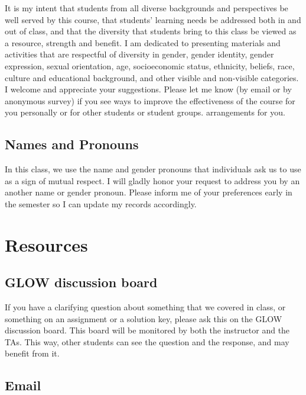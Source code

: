 \documentclass[11pt]{article}
\begin{document}
It is my intent that students from all diverse backgrounds and perspectives be well served by this
course, that students' learning needs be addressed both in and out of class, and that the diversity
that students bring to this class be viewed as a resource, strength and benefit. I am dedicated
to presenting materials and activities that are respectful of diversity in gender, gender identity,
gender expression, sexual orientation, age, socioeconomic status, ethnicity, beliefs, race, culture
and educational background, and other visible and non-visible categories. I welcome and appreciate your suggestions. Please let me know (by email or by anonymous survey) if you see ways to improve the effectiveness of the course for you personally or for other students or student groups. %
arrangements for you.

\subsection{Names and Pronouns}

In this class, we use the name and gender pronouns that individuals ask us to use as a sign of mutual respect. I will gladly honor your request to address you by an another name or gender pronoun. Please inform me of your preferences early in the semester so I can update my records accordingly.  %

\section{Resources}

\subsection{GLOW discussion board}

If you have a clarifying question about something that we covered in class, or something on an assignment or a solution key, please ask this on the GLOW discussion board. This board will be monitored by both the instructor and the TAs. This way, other students can see the question and the response, and may benefit from it. 

\subsection{Email}
\end{document}
